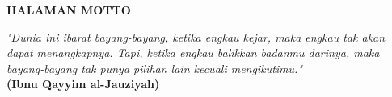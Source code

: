 \clearpage
{}
{}

\begin{center}
	\textbf{\large HALAMAN MOTTO}\\[5em]
\end{center}

\begin{center}
    \textit{"Dunia ini ibarat bayang-bayang, ketika engkau kejar, maka  engkau tak akan dapat menangkapnya. Tapi, ketika engkau balikkan badanmu darinya, maka bayang-bayang tak punya pilihan lain kecuali mengikutimu."} \\
    \textbf{(Ibnu Qayyim al-Jauziyah)} \\[1cm]
\end{center} 